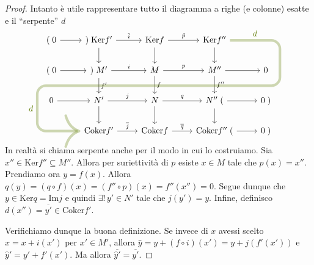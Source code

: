 \begin{proof}
    Intanto è utile rappresentare tutto il diagramma a righe (e colonne) esatte
    e il ``serpente'' \(d\)
    \[
        \begin{tikzcd}
        {(\;0} & )\;\mathrm{Ker}f' & \mathrm{Ker}f & \mathrm{Ker}f'' & \\
        {(\;0} & {)\;M'} & M & {M''} & 0 \\
        0 & {N'} & N & {N''\;(} & {0\;)} \\
          & \mathrm{Coker}f' & \mathrm{Coker}f & \mathrm{Coker}f''\;(
          & {0\;)}
        \arrow[from=1-1, to=1-2]
        \arrow["\tilde{i}", from=1-2, to=1-3]
        \arrow[from=1-2, to=2-2]
        \arrow["\tilde{p}", from=1-3, to=1-4]
        \arrow[from=1-3, to=2-3]
        \arrow[from=1-4, to=2-4]
        \arrow[from=2-1, to=2-2]
        \arrow["i", from=2-2, to=2-3]
        \arrow["{f'}", from=2-2, to=3-2]
        \arrow["p", from=2-3, to=2-4]
        \arrow["f", from=2-3, to=3-3]
        \arrow[from=2-4, to=2-5]
        \arrow["{f''}", from=2-4, to=3-4]
        \arrow[from=3-1, to=3-2]
        \arrow["j", from=3-2, to=3-3]
        \arrow[from=3-2, to=4-2]
        \arrow["q", from=3-3, to=3-4]
        \arrow[from=3-3, to=4-3]
        \arrow[from=3-4, to=3-5]
        \arrow[from=3-4, to=4-4]
        \arrow["\overline{j}", from=4-2, to=4-3]
        \arrow["\overline{q}", from=4-3, to=4-4]
        \arrow[from=4-4, to=4-5]
        \arrow[
            from=1-4,
            to=4-2,
            draw=applegreen,
            line width=3pt,
            draw opacity=.3,
            rounded corners=10pt,
            overlay,
            to path={
                (\tikztostart) --
                node[
                  above,
                  text=applegreen,
                ] {$d$}
                (\tikztostart -| (5, 0) -- 
                (5, 0) -- (-5, 0) --
                node[
                  left,
                  text=applegreen,
                ] {$d$}
                (-5, 0 |- \tikztotarget) --
                (\tikztotarget)
            }
        ]
    \end{tikzcd}
    \]
    In realtà si chiama serpente anche per il modo in cui lo costruiamo.
    Sia \(x'' \in \mathrm{Ker}f'' \subseteq M'' \). Allora per suriettività di
    \(p\) esiste \(x \in M\) tale che \(p{(x)} = x''\). Prendiamo ora \(y =
    f{(x)}\). Allora \(q{(y)} = {(q \circ f)}{(x)} = {(f'' \circ p)}{(x)} =
    f''{(x'')} = 0\). Segue dunque che \(y \in \mathrm{Ker}q = \mathrm{Im}j\) e
    quindi \(\exists !\, y' \in N' \) tale che \(j{(y')} = y\). Infine,
    definisco \(d{(x'')} = \overline{y'} \in \mathrm{Coker}f'\).

    Verifichiamo dunque la buona definizione. Se invece di \(x\) avessi scelto
    \(\widehat{x} = x + i{(x')}\) per \(x' \in M'\), allora \(\widehat{y} = y +
    {(f \circ i)}{(x')} = y + j{(f'{(x')})}\) e \(\widehat{y}' = y' +
    f'{(x')}\). Ma allora \(\overline{\widehat{y}'} = \overline{y'}\).
\end{proof}

